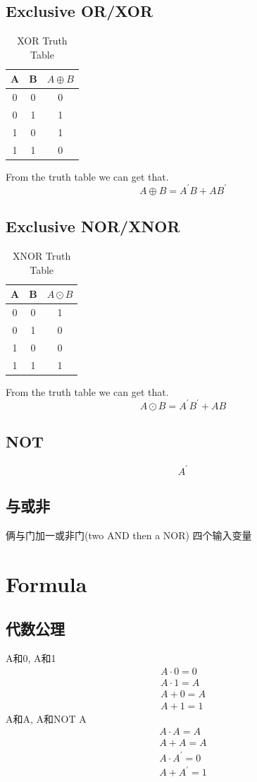 \documentclass[scheme=chinese,a4paper]{report}
\begin{document}
\subsection{Exclusive OR/XOR}
\begin{table}[htb]
    \centering
    \begin{tabular}{c c c}
    A&B&$A\oplus B$\\
    \hline
    0&0&0\\
    0&1&1\\
    1&0&1\\
    1&1&0\\
    \end{tabular}
    \caption{XOR Truth Table}
\end{table}

From the truth table we can get that. 
$$A \oplus B=A^\prime B+AB^\prime$$

\subsection{Exclusive NOR/XNOR}
\begin{table}[htb]
    \centering
    \begin{tabular}{c c c}
    A&B&$A\odot B$\\
    \hline
    0&0&1\\
    0&1&0\\
    1&0&0\\
    1&1&1\\
    \end{tabular}
    \caption{XNOR Truth Table}
\end{table}

From the truth table we can get that. 
$$A \odot B=A^\prime B^\prime+AB$$

\subsection{NOT}
$$A^\prime$$
\subsection{与或非}
俩与门加一或非门(two AND then a NOR)
四个输入变量
\section{Formula}
\subsection{代数公理}
A和0, A和1
\begin{align*}
    A\cdot 0=0\\
    A\cdot 1=A\\
    A+0=A\\
    A+1=1
\end{align*}
A和A, A和NOT A
\begin{align*}
A\cdot A=A\\
A +A=A\\
A\cdot A^\prime=0\\
A+A^\prime=1
\end{align*}
\end{document}
